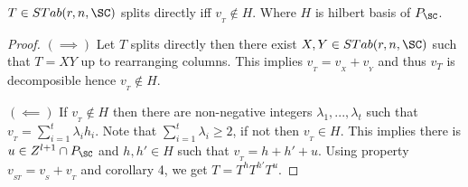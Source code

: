 {\begin{lemma}
    \(T \in STab(r,n,\SC)\) splits directly iff \(v_{_T} \not\in H\). 
    Where \(H\) is hilbert basis of \(P_{\SC}\).
\end{lemma}
\begin{proof}
    \((\implies)\)
    Let \(T\) splits directly then there exist \(X,Y \in STab(r,n,\SC)\) such that 
    \(T = XY\) up to rearranging columns. This implies \(v_{_T} = v_{_X} + v_{_Y}\) 
    and thus \(v_{T}\) is decomposible hence \(v_{_T} \not\in H\).

    \((\impliedby)\) If \(v_{_T} \not\in H\) then there are non-negative integers 
    \(\lambda_1,...,\lambda_t\) such that \(v_{_T} = \sum_{i=1}^t \lambda_i h_i\). 
    Note that \(\sum_{i=1}^t \lambda_i \ge 2\), if not then \(v_{_T} \in H\). 
    This implies there is \(u\in Z^{l+1}\cap P_{\SC} \) and \(h,h' \in H\) 
    such that \(v_{_T} = h + h' + u\). 
    Using property \(v_{_{ST}} = v_{_S} + v_{_T}\) and corollary 4, we get \(T=T^{h}T^{h'}T^u\).     
\end{proof}
}
